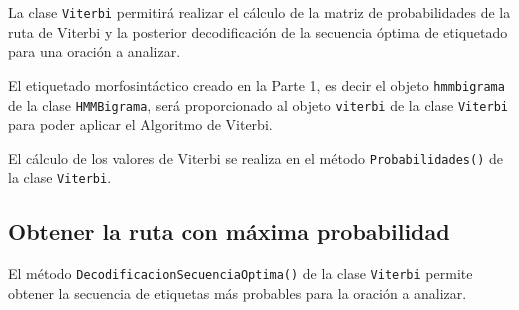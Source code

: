 \documentclass[12pt,a4paper,table]{article}
\begin{document}
La clase \texttt{Viterbi} permitirá realizar el cálculo de la matriz de
probabilidades de la ruta de Viterbi y la posterior decodificación de la
secuencia óptima de etiquetado para una oración a analizar.

El etiquetado morfosintáctico creado en la Parte 1, es decir el objeto
\texttt{hmmbigrama} de la clase \texttt{HMMBigrama}, será proporcionado
al objeto \texttt{viterbi} de la clase \texttt{Viterbi} para poder
aplicar el Algoritmo de Viterbi.

El cálculo de los valores de Viterbi se realiza en el método
\texttt{Probabilidades()} de la clase \texttt{Viterbi}.

    \hypertarget{obtener-la-ruta-con-muxe1xima-probabilidad}{%
\subsection*{Obtener la ruta con máxima
probabilidad}\label{obtener-la-ruta-con-muxe1xima-probabilidad}}

El método \texttt{DecodificacionSecuenciaOptima()} de la clase
\texttt{Viterbi} permite obtener la secuencia de etiquetas más probables
para la oración a analizar.
\end{document}
